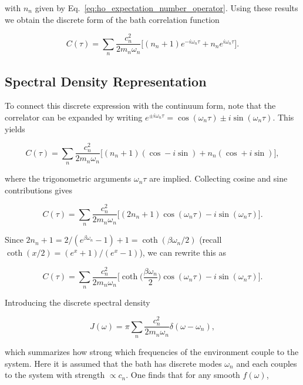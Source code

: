 \noindent
with $n_n$ given by Eq.~\eqref{eq:ho_expectation_number_operator}. Using these results we obtain the discrete form of the bath correlation function

\begin{equation} \label{eq:ho_correlator_result}
	C(\tau) = \sum_{n} \frac{c_n^2}{2 m_n \omega_n} \Big[(n_n+1) e^{-i \omega_n \tau} + n_n e^{i \omega_n \tau}\Big].
\end{equation}


\subsection{Spectral Density Representation}
\label{subsec:ho_spectral_density}

\noindent
To connect this discrete expression with the continuum form, note that the correlator can be expanded by writing $e^{\pm i \omega_n \tau} = \cos(\omega_n \tau) \pm i \sin(\omega_n \tau)$. This yields

\[
	C(\tau) = \sum_{n} \frac{c_n^2}{2 m_n \omega_n} \Big[ (n_n+1)(\cos - i \sin) + n_n(\cos + i \sin) \Big],
\]

\noindent
where the trigonometric arguments $\omega_n \tau$ are implied. Collecting cosine and sine contributions gives

\[
	C(\tau) = \sum_{n} \frac{c_n^2}{2 m_n \omega_n} \Big[(2 n_n + 1) \cos(\omega_n \tau) - i \sin(\omega_n \tau)\Big].
\]

\noindent
Since $2 n_n + 1 = 2/(e^{\beta \omega_n}-1) + 1 = \coth(\beta \omega_n / 2)$ (recall $\coth(x/2) = (e^{x}+1)/(e^{x}-1)$), we can rewrite this as

\begin{equation}
	C(\tau) = \sum_{n} \frac{c_n^2}{2 m_n \omega_n} \Big[ \coth\Big(\frac{\beta \omega_n}{2}\Big) \cos(\omega_n \tau) - i \sin(\omega_n \tau) \Big].
\end{equation}

\noindent
Introducing the discrete spectral density


\begin{equation} \label{eq:ho_bath_spectral_density}
	J(\omega) = \pi \sum_{n} \frac{c_n^2}{2 m_n \omega_n} \delta(\omega - \omega_n),
\end{equation}

\noindent
which summarizes how strong which frequencies of the environment couple to the system. Here it is assumed that the bath has discrete modes $\omega_n$ and each couples to the system with strength $\propto c_n$. One finds that for any smooth $f(\omega)$,

